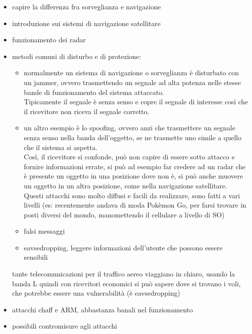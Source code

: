 \documentclass[oneside, 12pt]{extbook}
\begin{document}
\begin{itemize}
	\item capire la differenza fra sorveglianza e navigazione
	\item introduzione sui sistemi di navigazione satellitare
	\item funzionamento dei radar
	\item metodi comuni di disturbo e di protezione: 
	\begin{itemize}
		\item normalmente un sistema di navigazione o sorveglianza è disturbato con un jammer, ovvero trasmettendo un segnale ad alta potenza nelle stesse bande di funzionamento del sistema attaccato.
		\\Tipicamente il segnale è senza senso e copre il segnale di interesse così che il ricevitore non riceva il segnale corretto.
		\item un altro esempio è lo spoofing, ovvero anzi che trasmettere un segnale senza senso nella banda dell'oggetto, se ne trasmette uno simile a quello che il sistema si aspetta.
		\\Così, il ricevitore si confonde, può non capire di essere sotto attacco e fornire informazioni errate, si può ad esempio far credere ad un radar che è presente un oggetto in una posizione dove non è, si può anche muovere un oggetto in un altra posizione, come nella navigazione satellitare.
		\\Questi attacchi sono molto diffusi e facili da realizzare, sono fatti a vari livelli (es: recentemente andava di moda Pokèmon Go, per farsi trovare in posti diversi del mondo, manomettendo il cellulare a livello di SO)
		\item falsi messaggi
		\item eavsedropping, leggere informazioni dell'utente che possono essere sensibili
	\end{itemize}
	tante telecomunicazioni per il traffico aereo viaggiano in chiaro, usando la banda L quindi con ricevitori economici si può sapere dove si trovano i voli, che potrebbe essere una vulnerabilità (è eavsedropping)
	\item attacchi chaff e ARM, abbastanza banali nel funzionamento
	\item possibili contromisure agli attacchi
\end{itemize}
\end{document}
